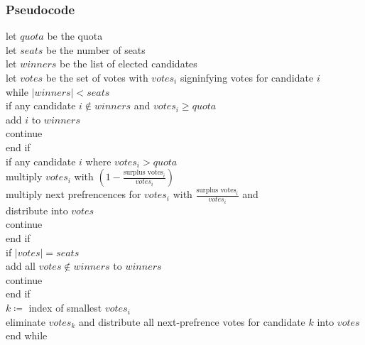 \documentclass[12pt]{article}
\newcommand\tab[1][1cm]{\hspace*{#1}}
\begin{document}
\subsubsection{Pseudocode}
\label{Stv psuedocode}
let $quota$ be the quota \\
let $seats$ be the number of seats \\
let $winners$ be the list of elected candidates \\
let $votes$ be the set of votes with $votes_{i}$ signinfying votes for candidate $i$\\
while $\left\vert{winners}\right\vert < seats$\\
\tab if any candidate $i \notin winners$ and $votes_{i} \geq quota$ \\
\tab\tab add $i$ to $winners$ \\
\tab\tab continue \\
\tab end if \\
\tab if any candidate $i$ where $votes_{i} > quota$\\
\tab\tab multiply $votes_{i}$ with $(1 - \frac{\text{surplus votes}_{i}}{votes_{i}})$ \\
\tab\tab multiply next prefrencences for $votes_{i}$ with $\frac{\text{surplus votes}_{i}}{votes_{i}}$ and \\ \tab\tab distribute into $votes$\\
\tab\tab continue \\
\tab end if \\
\tab if $\left\vert{votes}\right\vert = seats$ \\
\tab\tab add all $votes \notin winners$ to $winners$ \\
\tab\tab continue \\
\tab end if \\
\tab $k \coloneqq$ index of smallest $votes_{i}$ \\
\tab eliminate $votes_{k}$ and distribute all next-prefrence votes for candidate $k$ \tab into $votes$\\
end while
\end{document}
